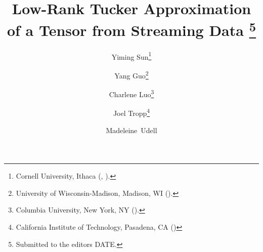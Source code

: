 \newcommand{\cf}{cf.}
\newcommand{\eg}{e.g.}
\newcommand{\ie}{i.e.}
\newcommand{\etc}{etc.}

\newcommand{\beas}{\begin{eqnarray*}}
\newcommand{\eeas}{\end{eqnarray*}}
\newcommand{\bea}{\begin{eqnarray}}
\newcommand{\eea}{\end{eqnarray}}
\newcommand{\beq}{\begin{equation}}
\newcommand{\eeq}{\end{equation}}
\newcommand{\bit}{\begin{itemize}}
\newcommand{\eit}{\end{itemize}}
\newcommand{\ben}{\begin{enumerate}}
\newcommand{\een}{\end{enumerate}}



\title{Low-Rank Tucker Approximation of a Tensor from Streaming Data
\thanks{Submitted to the editors DATE.
}}

\author{Yiming Sun\thanks{Cornell University, Ithaca
		(, ).}
	\and Yang Guo\thanks{University of Wisconsin-Madison, Madison, WI
		().}
	\and Charlene Luo\thanks{Columbia University, New York, NY ().}
	\and
	Joel Tropp\thanks{California Institute of Technology, Pasadena, CA ()}
	\and \mbox{Madeleine Udell}\footnotemark[2]
}



\usepackage{amsopn}
\DeclareMathOperator{\diag}{diag}

\newcommand{\reals}{\mathbb{R}}



